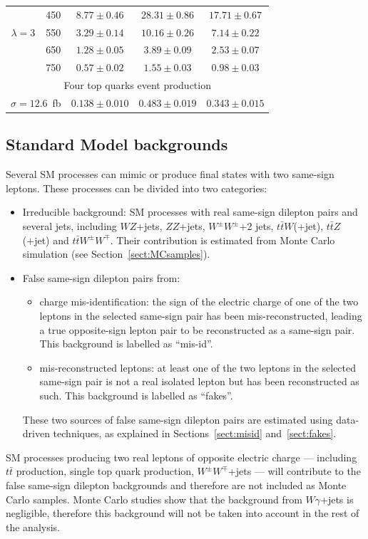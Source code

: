 \begin{table}[p]
\begin{center}
\begin{tabular}{c|c|c|c|c}
      \hline
      & 450 & $8.77 \pm 0.46$ & $28.31 \pm 0.86$ & $17.71 \pm 0.67$ \\
      $\lambda=3$ & 550 & $3.29 \pm 0.14$ & $10.16  \pm 0.26$ & $7.14  \pm 0.22$ \\
      & 650 & $1.28 \pm 0.05$ & $3.89  \pm 0.09$ & $2.53  \pm 0.07$ \\
      & 750 & $0.57 \pm 0.02$ & $1.55  \pm 0.03$ & $0.98  \pm 0.03$ \\
      \hline
      \multicolumn{5}{c}{Four top quarks event production} \\
      \hline
      \multicolumn{2}{c|}{$\sigma=12.6$~fb} & $0.138 \pm 0.010$ & $0.483\pm 0.019$& $0.343\pm 0.015$\\
      \hline
    \end{tabular}
  \end{center}
\end{table}

\subsection{Standard Model backgrounds}\label{sect:back}
Several SM processes can mimic or produce final states with two same-sign leptons. 
These processes can be divided into two categories:
\begin{itemize}
\item Irreducible background: SM processes with real same-sign dilepton pairs and
several jets, 
including $WZ$+jets, $ZZ$+jets, $W^{\pm}W^{\pm}$+2 jets, $t\bar{t}W$(+jet), $t\bar{t}Z$(+jet) and
$t\bar{t}W^{\pm}W^{\mp}$. Their contribution is estimated from Monte Carlo simulation
(see Section~\ref{sect:MCsamples}).
\item False same-sign dilepton pairs from:
  \begin{itemize}
  \item charge mis-identification: the sign of the electric charge of one of the two leptons in the 
    selected same-sign pair has been mis-reconstructed, leading a true opposite-sign lepton pair
    to be reconstructed as a same-sign pair.
    This background is labelled as ``mis-id''.
  \item mis-reconstructed leptons: at least one of the two leptons in the selected same-sign pair is not
    a real isolated lepton but has been reconstructed as such. This background is labelled as ``fakes''.
  \end{itemize}
  These two sources of false same-sign dilepton pairs are estimated using data-driven
  techniques, as explained in Sections~\ref{sect:misid} and~\ref{sect:fakes}.
\end{itemize}
SM processes producing two real leptons of opposite electric charge --- including 
$t\bar{t}$ production, single top quark production, $W^{\pm}W^{\mp}$+jets --- will contribute
to the false same-sign dilepton backgrounds and therefore are not included as Monte Carlo samples.
Monte Carlo studies show that the background from $W\gamma$+jets is negligible, therefore
this background will not be taken into account in the rest of the analysis.

